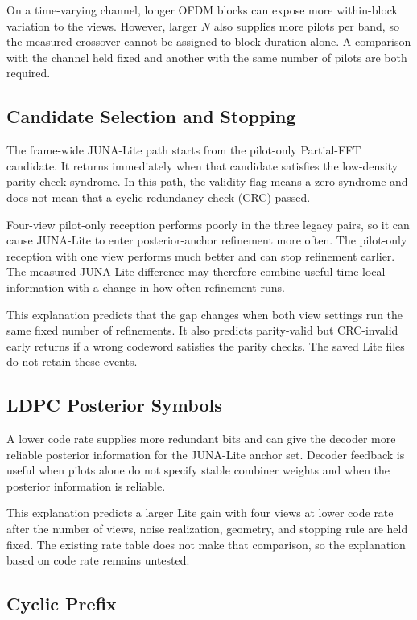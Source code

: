 \documentclass[11pt]{article}
\begin{document}
On a time-varying channel, longer OFDM blocks can expose more within-block
variation to the views.  However,
larger $N$ also supplies more pilots per band, so the measured crossover
cannot be assigned to block duration alone.  A comparison with the channel
held fixed and another with the same number of pilots are both required.

\subsection{Candidate Selection and Stopping}

The frame-wide JUNA-Lite path starts from the pilot-only Partial-FFT candidate.
It returns immediately when that candidate satisfies the low-density
parity-check syndrome.  In this path, the validity flag means a zero
syndrome and does not mean that a cyclic redundancy check (CRC) passed.

Four-view pilot-only reception performs poorly in the three legacy pairs, so
it can cause JUNA-Lite to enter posterior-anchor refinement more often.  The
pilot-only reception with one view performs much better and can stop refinement
earlier.  The measured JUNA-Lite difference may therefore combine useful
time-local information with a change in how often refinement runs.

This explanation predicts that the gap changes when both view settings run
the same fixed number of refinements.  It also predicts parity-valid but
CRC-invalid early returns if a wrong codeword satisfies the parity checks.
The saved Lite files do not retain these events.

\subsection{LDPC Posterior Symbols}

A lower code rate supplies more redundant bits and can give the decoder more
reliable posterior information for the JUNA-Lite anchor set.  Decoder feedback
is useful when pilots alone do not specify stable combiner weights and when the
posterior information is reliable.

This explanation predicts a larger Lite gain with four views at lower code rate
after the number of views, noise realization, geometry, and stopping rule are
held fixed.  The existing rate table does not make that comparison, so the
explanation based on code rate remains untested.

\subsection{Cyclic Prefix}
\end{document}
